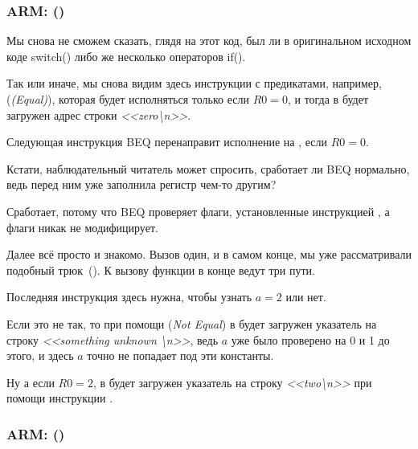 \subsubsection{ARM: \OptimizingKeilVI (\ARMMode)}



Мы снова не сможем сказать, глядя на этот код, был ли в оригинальном исходном коде switch() 
либо же несколько операторов if().

Так или иначе, мы снова видим здесь инструкции с предикатами, например, \ADREQ (\emph{(Equal)}), 
которая будет исполняться только
если $R0=0$, и тогда в  будет загружен адрес строки \emph{<<zero\textbackslash{}n>>}.

Следующая инструкция \ac{BEQ} перенаправит исполнение на , если $R0=0$.

Кстати, наблюдательный читатель может спросить, сработает ли \ac{BEQ} нормально,
ведь \ADREQ перед ним уже заполнила регистр  чем-то другим?

Сработает, потому что \ac{BEQ} проверяет флаги, установленные инструкцией \CMP, 
а \ADREQ флаги никак не модифицирует.

Далее всё просто и знакомо. 
Вызов \printf один, и в самом конце, мы уже рассматривали подобный трюк~().
К вызову функции \printf{} в конце ведут три пути.

Последняя инструкция  здесь нужна, чтобы узнать $a=2$ или нет.

Если это не так, то при помощи \ADRNE (\emph{Not Equal}) в  будет загружен указатель на 
строку \emph{<<something unknown \textbackslash{}n>>}, ведь $a$ уже было проверено на 0 и 1 до этого, 
и здесь $a$ точно не попадает под эти константы.

Ну а если $R0=2$, в  будет загружен указатель на строку \emph{<<two\textbackslash{}n>>} при помощи инструкции \ADREQ.

\subsubsection{ARM: \OptimizingKeilVI (\ThumbMode)}



